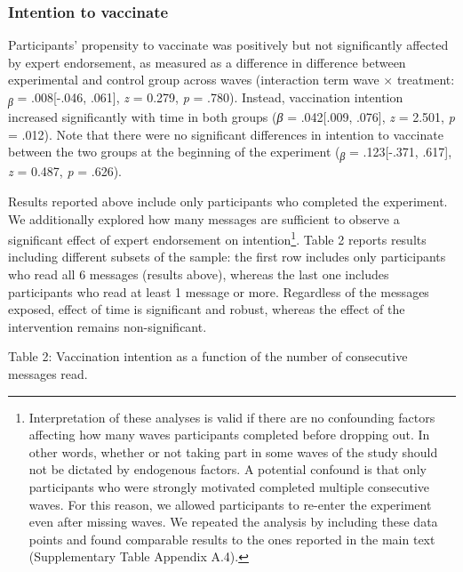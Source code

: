 \documentclass[authordate, empirical]{jote-new-article}
\begin{document}
	\subsubsection{Intention to vaccinate}



	Participants' propensity to vaccinate was positively but not significantly affected by expert endorsement, as measured as a difference in difference between experimental and control group across waves (interaction term wave × treatment: \textsubscript{\emph{β }}= .008[-.046, .061], \emph{z }= 0.279, \emph{p }= .780). Instead, vaccination intention increased significantly with time in both groups (\emph{β }= .042[.009, .076], \emph{z }= 2.501, \emph{p }= .012). Note that there were no significant differences in intention to vaccinate between the two groups at the beginning of the experiment (\textsubscript{\emph{β }}= .123[-.371, .617], \emph{z }= 0.487, \emph{p }= .626).



	Results reported above include only participants who completed the experiment. We additionally explored how many messages are sufficient to observe a significant effect of expert endorsement on intention\footnote{ Interpretation of these analyses is valid if there are no confounding factors affecting how many waves participants completed before dropping out. In other words, whether or not taking part in some waves of the study should not be dictated by endogenous factors. A potential confound is that only participants who were strongly motivated completed multiple consecutive waves. For this reason, we allowed participants to re-enter the experiment even after missing waves. We repeated the analysis by including these data points and found comparable results to the ones reported in the main text (Supplementary Table Appendix A.4).}. Table 2 reports results including different subsets of the sample: the first row includes only participants who read all 6 messages (results above), whereas the last one includes participants who read at least 1 message or more. Regardless of the messages exposed, effect of time is significant and robust, whereas the effect of the intervention remains non-significant.







	Table 2: Vaccination intention as a function of the number of consecutive messages read.
\end{document}
